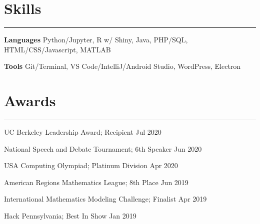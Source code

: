 \documentclass[11pt]{article}
\newcommand{\resumesection}[1]{\vspace{-0.3cm}\section*{\color{highlight}#1}\vspace{-0.3cm}\hrule\vspace{0.3cm}}
\begin{document}
\resumesection{Skills}

\textbf{Languages} Python/Jupyter, R w/ Shiny, Java, PHP/SQL, HTML/CSS/Javascript, MATLAB\par
\textbf{Tools} Git/Terminal, VS Code/IntelliJ/Android Studio, WordPress, Electron

\resumesection{Awards}

UC Berkeley Leadership Award; Recipient \hfill Jul 2020 \par
National Speech and Debate Tournament; 6th Speaker \hfill Jun 2020\par
USA Computing Olympiad; Platinum Division \hfill Apr 2020 \par
American Regions Mathematics League; 8th Place \hfill Jun 2019 \par
International Mathematics Modeling Challenge; Finalist \hfill Apr 2019\par
Hack Pennsylvania; Best In Show \hfill Jan 2019 \par
\end{document}
